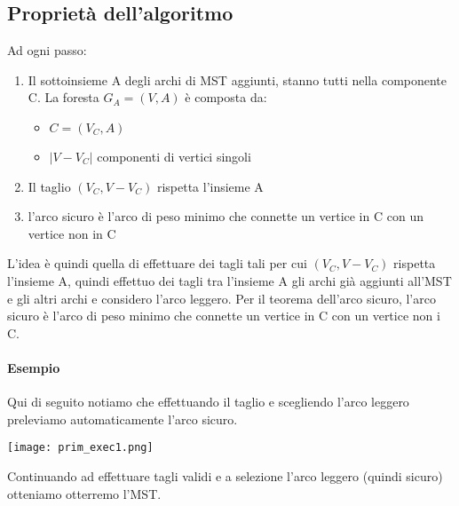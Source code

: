 \subsection{Proprietà dell'algoritmo}
Ad ogni passo:
\begin{enumerate}
    \item Il sottoinsieme A degli archi di MST aggiunti, stanno tutti nella componente C.
    La foresta $G_A = (V,A)$ è composta da:
    \begin{itemize}
        \item $C = (V_C, A)$
        \item $|V-V_C|$ componenti di vertici singoli
    \end{itemize}
    \item Il taglio $(V_C, V-V_C)$ rispetta l'insieme A
    \item l'arco sicuro è l'arco di peso minimo che connette un vertice in C con
    un vertice non in C
\end{enumerate}
L'idea è quindi quella di effettuare dei tagli tali per cui $(V_C, V-V_C)$ rispetta
l'insieme A, quindi effettuo dei tagli tra l'insieme A gli archi già aggiunti
all'MST e gli altri archi e considero l'arco leggero. Per il teorema dell'arco sicuro, 
l'arco sicuro è l'arco di peso minimo che connette un vertice in C con un vertice
non i C.
\paragraph*{Esempio} Qui di seguito notiamo che effettuando il taglio e scegliendo l'arco
leggero preleviamo automaticamente l'arco sicuro.
\begin{center}
    \texttt{[image: prim\_exec1.png]}
\end{center}
Continuando ad effettuare tagli validi e a selezione l'arco leggero (quindi sicuro) otteniamo
otterremo l'MST.
